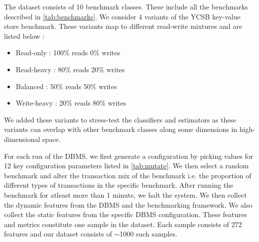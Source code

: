 The dataset consists of 10 benchmark classes. These include all the benchmarks
described in \cref{tab:benchmarks}. We consider 4 variants of the YCSB key-value
store benchmark. These variants map to different read-write mixtures and are
listed below :

\begin{itemize}
  \item {Read-only : 100\% reads 0\% writes } 
  \item {Read-heavy : 80\% reads 20\% writes } 
  \item {Balanced : 50\% reads 50\% writes } 
  \item {Write-heavy : 20\% reads 80\% writes } 
\end{itemize}

We added these variants to stress-test the classifiers and estimators as these
variants can overlap with other benchmark classes along some dimensions in
high-dimensional space. 

For each run of the DBMS, we first generate a configuration by picking
values for 12 key configuration parameters listed in \cref{tab:mutate}.
We then select a random benchmark and alter the transaction mix of the
benchmark i.e. the proportion of different types of transactions in 
the specific benchmark. After running the benchmark for atleast more than
1 minute, we halt the system.  We then collect the dynamic features from the
DBMS and the benchmarking framework. We also collect the static features
from the specific DBMS configuration. These features and metrics constitute
one sample in the dataset.
Each sample consists of 272 features and our dataset consists of $\sim$1000
such samples.

